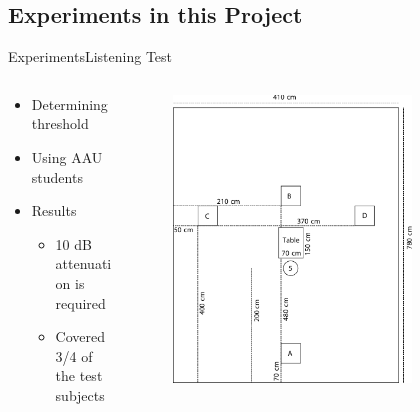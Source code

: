 \subsection{Experiments in this Project}
\begin{frame}{Experiments}{Listening Test}		
	\begin{columns}
		\begin{column}{0.5\textwidth}
			\begin{itemize}
				\item Determining threshold
				\item Using AAU students
				\item Results
				\begin{itemize}
					\item 10 dB attenuation is required
					\item Covered 3/4 of the test subjects 
				\end{itemize}
			\end{itemize}	
		\end{column}	
		\begin{column}{0.5\textwidth} 
			\begin{figure}
					\includegraphics[width=0.8\textwidth]{figures/ListeningTestSetup.pdf}
			\end{figure}
		\end{column}
	\end{columns}
\end{frame}


